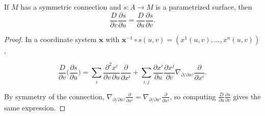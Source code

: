 \begin{lemma}[symmetry]
  \label{lem:dc-ch3-3-4}
  \leanok
  If $M$ has a symmetric connection and $s:A\to M$ is a parametrized surface, then
  $$
  \frac{D}{\partial v}\frac{\partial s}{\partial u}=\frac{D}{\partial u}\frac{\partial s}{\partial v}.
  $$
\end{lemma}
\begin{proof}
  \sketch
  \leanok
  In a coordinate system $\mathbf{x}$ with
  $\mathbf{x}^{-1}\circ s(u,v)=(x^1(u,v),\dots,x^n(u,v))$,
  
  $$
  \frac{D}{\partial v}\Big(\frac{\partial s}{\partial u}\Big)=\sum_i\frac{\partial^2 x^i}{\partial v\,\partial u}\frac{\partial}{\partial x^i}+\sum_{i,j}\frac{\partial x^i}{\partial u}\frac{\partial x^j}{\partial v}\nabla_{\partial/\partial x^j}\frac{\partial}{\partial x^i}.
  $$
  
  By symmetry of the connection,
  $\nabla_{\partial/\partial x^j}\frac{\partial}{\partial x^i}=\nabla_{\partial/\partial x^i}\frac{\partial}{\partial x^j}$,
  so computing $\frac{D}{\partial u}\frac{\partial s}{\partial v}$ gives the same
  expression.
\end{proof}

